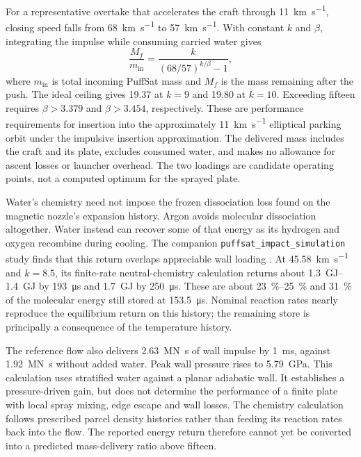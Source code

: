 \documentclass{article}
\begin{document}
For a representative overtake that accelerates the craft through \SI{11}{\kilo\meter\per\second}, closing speed falls from \SI{68}{\kilo\meter\per\second} to \SI{57}{\kilo\meter\per\second}. With constant $k$ and $\beta$, integrating the impulse while consuming carried water gives
\begin{equation}
    \frac{M_f}{m_{\mathrm{in}}}
    =\frac{k}{(68/57)^{k/\beta}-1},
    \label{eq:water_plate_delivery}
\end{equation}
where $m_{\mathrm{in}}$ is total incoming PuffSat mass and $M_f$ is the mass remaining after the push. The ideal ceiling gives \num{19.37} at $k=9$ and \num{19.80} at $k=10$. Exceeding fifteen requires $\beta>3.379$ and $\beta>3.454$, respectively. These are performance requirements for insertion into the approximately \SI{11}{\kilo\meter\per\second} elliptical parking orbit under the impulsive insertion approximation. The delivered mass includes the craft and its plate, excludes consumed water, and makes no allowance for ascent losses or launcher overhead. The two loadings are candidate operating points, not a computed optimum for the sprayed plate.

Water's chemistry need not impose the frozen dissociation loss found on the magnetic nozzle's expansion history. Argon avoids molecular dissociation altogether. Water instead can recover some of that energy as its hydrogen and oxygen recombine during cooling. The companion \texttt{puffsat\_impact\_simulation} study finds that this return overlaps appreciable wall loading \cite{Katz_puffsat_impact_sim_2026,Katz_water_injected_plate_2026}. At \SI{45.58}{\kilo\meter\per\second} and $k=8.5$, its finite-rate neutral-chemistry calculation returns about \SIrange{1.3}{1.4}{\giga\joule} by \SI{193}{\micro\second} and \SI{1.7}{\giga\joule} by \SI{250}{\micro\second}. These are about \SIrange{23}{25}{\percent} and \SI{31}{\percent} of the molecular energy still stored at \SI{153.5}{\micro\second}. Nominal reaction rates nearly reproduce the equilibrium return on this history; the remaining store is principally a consequence of the temperature history.

The reference flow also delivers \SI{2.63}{\mega\newton\second} of wall impulse by \SI{1}{\milli\second}, against \SI{1.92}{\mega\newton\second} without added water. Peak wall pressure rises to \SI{5.79}{\giga\pascal}. This calculation uses stratified water against a planar adiabatic wall. It establishes a pressure-driven gain, but does not determine the performance of a finite plate with local spray mixing, edge escape and wall losses. The chemistry calculation follows prescribed parcel density histories rather than feeding its reaction rates back into the flow. The reported energy return therefore cannot yet be converted into a predicted mass-delivery ratio above fifteen.
\end{document}
